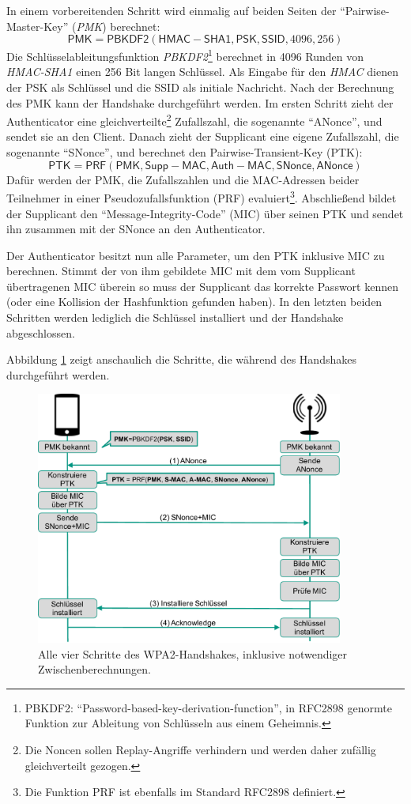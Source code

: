 In einem vorbereitenden Schritt wird einmalig auf beiden Seiten der \enquote{Pairwise-Master-Key} (\textit{PMK}) berechnet:
\[\mathsf{PMK} = \mathsf{PBKDF2}(\mathsf{HMAC-SHA1}, \mathsf{PSK}, \mathsf{SSID}, 4096, 256)\]
Die Schlüsselableitungsfunktion \textit{PBKDF2}\footnote{PBKDF2: \enquote{Password-based-key-derivation-function}, in RFC2898 genormte Funktion zur Ableitung von Schlüsseln aus einem Geheimnis.} berechnet in 4096 Runden von \textit{HMAC-SHA1} einen 256 Bit langen Schlüssel.
Als Eingabe für den \textit{HMAC} dienen der PSK als Schlüssel und die SSID als initiale Nachricht.
Nach der Berechnung des PMK kann der Handshake durchgeführt werden.
Im ersten Schritt zieht der Authenticator eine gleichverteilte\footnote{Die Noncen sollen Replay-Angriffe verhindern und werden daher zufällig gleichverteilt gezogen.} Zufallszahl, die sogenannte \enquote{ANonce}, und sendet sie an den Client.
Danach zieht der Supplicant eine eigene Zufallszahl, die sogenannte \enquote{SNonce}, und berechnet den Pairwise-Transient-Key (PTK):
\[\mathsf{PTK} = \mathsf{PRF}(\mathsf{PMK}, \mathsf{Supp-MAC}, \mathsf{Auth-MAC}, \mathsf{SNonce}, \mathsf{ANonce})\]
Dafür werden der PMK, die Zufallszahlen und die MAC-Adressen beider Teilnehmer in einer Pseudozufallsfunktion (PRF) evaluiert\footnote{Die Funktion PRF ist ebenfalls im Standard RFC2898 definiert.}.
Abschließend bildet der Supplicant den \enquote{Message-Integrity-Code} (MIC) über seinen PTK und sendet ihn zusammen mit der SNonce an den Authenticator.

Der Authenticator besitzt nun alle Parameter, um den PTK inklusive MIC zu berechnen.
Stimmt der von ihm gebildete MIC mit dem vom Supplicant übertragenen MIC überein so muss der Supplicant das korrekte Passwort kennen (oder eine Kollision der Hashfunktion gefunden haben).
In den letzten beiden Schritten werden lediglich die Schlüssel installiert und der Handshake abgeschlossen.

Abbildung \ref{fig:wpa2handshake} zeigt anschaulich die Schritte, die während des Handshakes durchgeführt werden.
\begin{figure}[ht]
	\centering
	\includegraphics[width=0.90\textwidth]{graphics/wpa2handshake}
	\caption[WPA2-PSK-Handshake]{Alle vier Schritte des WPA2-Handshakes, inklusive notwendiger Zwischenberechnungen.}
	\label{fig:wpa2handshake}
\end{figure}

\FloatBarrier
